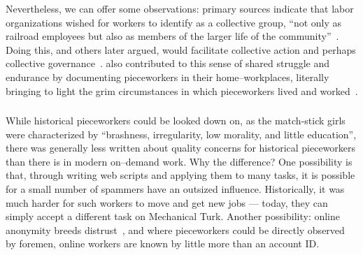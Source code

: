 \documentclass[trackingWork]{subfiles}
\begin{document}
Nevertheless, we can offer some observations:
primary sources indicate that labor organizations wished for workers to identify as a collective group, 
``not only as railroad employees but also as members of the larger life of the community''~\cite{american1921problem}.
Doing this, 
\citeauthor{ostrom1990governing} and others later argued,
would facilitate collective action and perhaps collective governance~\cite{ostrom1990governing,russell1982collective,olsonlogic}.
\citeauthor{riisOtherSideLives} also contributed to this sense of shared struggle and endurance
by documenting pieceworkers in their home--workplaces,
literally bringing to light the grim circumstances in which pieceworkers lived and worked~\cite{riisOtherSideLives}.


\subsubsection{\whatchanged}

\begin{comment}
	*workers make little money but love autonomy --- workers make little money
	workers blamed for quality --- ???
	both cases, sociality is hard
	*collective action hard --- collective action succeeded
	- algorithms, not managers
\end{comment}

While historical pieceworkers could be looked down on, as the match-stick girls were characterized by ``brashness, irregularity, low morality, and little education'', there was generally less written about quality concerns for historical pieceworkers than there is in modern on--demand work. 
Why the difference? 
One possibility is that, through writing web scripts and applying them to many tasks, it is possible for a small number of spammers have an outsized influence.
Historically, it was much harder for such workers to move and get new jobs --- today, they can simply accept a different task on Mechanical Turk.
Another possibility: online anonymity breeds distrust~\cite{friedman2000trust}, and where pieceworkers could be directly observed by foremen, online workers are known by little more than an account ID.
\end{document}
